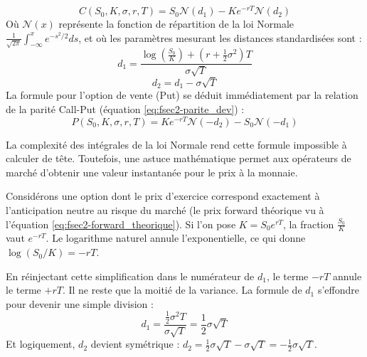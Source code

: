 \begin{theorembox}
\begin{equation}
    \label{eq:fsec3-black_scholes_call}
    C(S_0, K, \sigma, r, T) = S_0 \mathcal{N}(d_1) - K e^{-rT} \mathcal{N}(d_2)
\end{equation}
Où $\mathcal{N}(x)$ représente la fonction de répartition de la loi Normale $\frac{1}{\sqrt{2\pi}} \int_{-\infty}^{x} e^{-s^2/2} ds$, et où les paramètres mesurant les distances standardisées sont :
\begin{equation}
    \label{eq:fsec3-bs_d1}
    d_1 = \frac{\log\left(\frac{S_0}{K}\right) + \left( r + \frac{1}{2}\sigma^2 \right)T}{\sigma \sqrt{T}}
\end{equation}
\begin{equation}
    \label{eq:fsec3-bs_d2}
    d_2 = d_1 - \sigma \sqrt{T}
\end{equation}
La formule pour l'option de vente (Put) se déduit immédiatement par la relation de la parité Call-Put (équation \ref{eq:fsec2-parite_dev}) :
\begin{equation}
    \label{eq:fsec3-black_scholes_put}
    P(S_0, K, \sigma, r, T) = K e^{-rT} \mathcal{N}(-d_2) - S_0 \mathcal{N}(-d_1)
\end{equation}
\end{theorembox}

La complexité des intégrales de la loi Normale rend cette formule impossible à calculer de tête. Toutefois, une astuce mathématique permet aux opérateurs de marché d'obtenir une valeur instantanée pour le prix à la monnaie.

Considérons une option dont le prix d'exercice correspond exactement à l'anticipation neutre au risque du marché (le prix forward théorique vu à l'équation \ref{eq:fsec2-forward_theorique}). Si l'on pose $K = S_0 e^{rT}$, la fraction $\frac{S_0}{K}$ vaut $e^{-rT}$.
Le logarithme naturel annule l'exponentielle, ce qui donne $\log(S_0/K) = -rT$.

En réinjectant cette simplification dans le numérateur de $d_1$, le terme $-rT$ annule le terme $+rT$. Il ne reste que la moitié de la variance. La formule de $d_1$ s'effondre pour devenir une simple division :
\begin{equation}
    \label{eq:fsec3-d1_simplifie}
    d_1 = \frac{\frac{1}{2}\sigma^2 T}{\sigma \sqrt{T}} = \frac{1}{2}\sigma \sqrt{T}
\end{equation}
Et logiquement, $d_2$ devient symétrique : $d_2 = \frac{1}{2}\sigma \sqrt{T} - \sigma \sqrt{T} = -\frac{1}{2}\sigma \sqrt{T}$.

